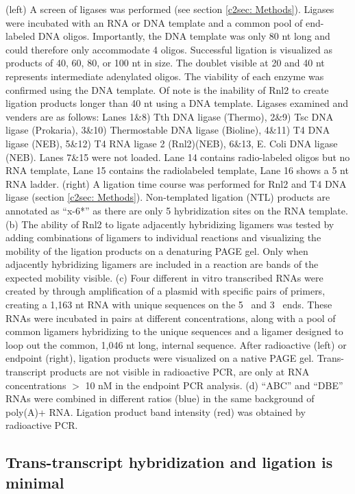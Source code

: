			(left) A screen of ligases was performed (see section \ref{c2sec: Methods}). Ligases were incubated with an RNA or DNA template and a common pool of end-labeled DNA oligos. Importantly, the DNA template was only 80 nt long and could therefore only accommodate 4 oligos. Successful ligation is visualized as products of 40, 60, 80, or 100 nt in size. The doublet visible at 20 and 40 nt represents intermediate adenylated oligos. The viability of each enzyme was confirmed using the DNA template. Of note is the inability of Rnl2 to create ligation products longer than 40 nt using a DNA template. Ligases examined and venders are as follows: Lanes 1\&8) Tth DNA ligase (Thermo), 2\&9) Tsc DNA ligase (Prokaria), 3\&10) Thermostable DNA ligase (Bioline), 4\&11) T4 DNA ligase (NEB), 5\&12) T4 RNA ligase 2 (Rnl2)(NEB), 6\&13, E. Coli DNA ligase (NEB). Lanes 7\&15 were not loaded. Lane 14 contains radio-labeled oligos but no RNA template, Lane 15 contains the radiolabeled template, Lane 16 shows a 5 nt RNA ladder.
			(right) A ligation time course was performed for Rnl2 and T4 DNA ligase (section \ref{c2sec: Methods}). Non-templated ligation (NTL) products are annotated as ``x-6*'' as there are only 5 hybridization sites on the RNA template.
			(b) The ability of Rnl2 to ligate adjacently hybridizing ligamers was tested by adding combinations of ligamers to individual reactions and visualizing the mobility of the ligation products on a denaturing PAGE gel. Only when adjacently hybridizing ligamers are included in a reaction are bands of the expected mobility visible. 
			(c) Four different in vitro transcribed RNAs were created by through amplification of a plasmid with specific pairs of primers, creating a 1,163 nt RNA with unique sequences on the 5\textprime~ and 3\textprime~ ends. These RNAs were incubated in pairs at different concentrations, along with a pool of common ligamers hybridizing to the unique sequences and a ligamer designed to loop out the common, 1,046 nt long, internal sequence. After radioactive (left) or endpoint (right), ligation products were visualized on a native PAGE gel. Trans-transcript products are not visible in radioactive PCR, are only at RNA concentrations $>$ 10 nM in the endpoint PCR analysis.
			(d) ``ABC'' and ``DBE'' RNAs were combined in different ratios (blue) in the same background of poly(A)+ RNA. Ligation product band intensity (red) was obtained by radioactive PCR.

	\subsection{Trans-transcript hybridization and ligation is minimal}\label{SeqZipPaper:subsec: Trans-transcript hyb and ligation}

